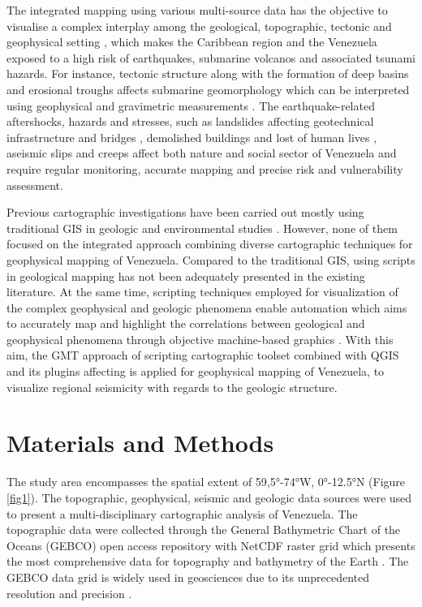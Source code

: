 \documentclass[sustainability,article,submit,pdftex,moreauthors]{Definitions/mdpi}
\begin{document}
The integrated mapping using various multi-source data has the objective to visualise a complex interplay among the geological, topographic, tectonic and geophysical setting \cite{Lemenkova2021a}, which makes the Caribbean region and the Venezuela exposed to a high risk of earthquakes, submarine volcanos and associated tsunami hazards. For instance, tectonic structure along with the formation of deep basins and erosional troughs affects submarine geomorphology \cite{Lemenkova2021c} which can be interpreted using geophysical and gravimetric measurements \cite{Lemenkova2021e}. The earthquake-related aftershocks, hazards and stresses, such as landslides affecting geotechnical infrastructure and bridges \cite{Salcedo}, demolished buildings and lost of human lives \cite{Rodriguez2018}, aseismic slips and creeps \cite{Pousse2016} affect both nature and social sector of Venezuela and require regular monitoring, accurate mapping and precise risk and vulnerability assessment. 

Previous cartographic investigations have been carried out mostly using traditional GIS in geologic and environmental studies \citep{Gonzalez,Klauco2013,Klauco2017,Lemenkova2020d,Hackley,Schmitz2021,Sun}. However, none of them focused on the integrated approach combining diverse cartographic techniques for geophysical mapping of Venezuela. Compared to the traditional GIS, using scripts in geological mapping has not been adequately presented in the existing literature. At the same time, scripting techniques employed for visualization of the complex geophysical and geologic phenomena enable automation which aims to accurately map and highlight the correlations between geological and geophysical phenomena through objective machine-based graphics  \citep{Lemenkov2021a,Lemenkov2021b}. With this aim, the GMT approach of scripting cartographic toolset combined with QGIS and its plugins affecting is applied for geophysical mapping of Venezuela, to visualize regional seismicity with regards to the geologic structure. 

\section{Materials and Methods}

The study area encompasses the spatial extent of 59,5°-74°W, 0°-12.5°N (Figure \ref{fig1}). The topographic, geophysical, seismic and geologic data sources were used to present a multi-disciplinary cartographic analysis of Venezuela. The topographic data were collected through the General Bathymetric Chart of the Oceans (GEBCO) open access repository with NetCDF raster grid \cite{GEBCO} which presents the most comprehensive data for topography and bathymetry of the Earth \cite{Schenke}. The GEBCO data grid is widely used in geosciences due to its unprecedented resolution and precision \citep{Mcmichael,Lemenkova2020c,Lemenkova2022c,Cortina}. 
\end{document}
